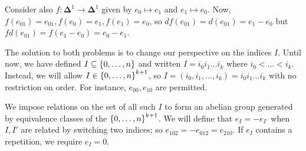 Consider also \( f \colon \bm\Delta^1 \to \bm\Delta^1 \) given by \( e_0 \mapsto e_1 \) and \( e_1 \mapsto e_0 \).
Now, \( f(e_{01}) = e_{01}, f(e_0) = e_1, f(e_1) = e_0 \), so \( df(e_{01}) = d(e_{01}) = e_1 - e_0 \) but \( fd(e_{01}) = f(e_1 - e_0) = e_0 - e_1 \).

The solution to both problems is to change our perspective on the indices \( I \).
Until now, we have defined \( I \subseteq \qty{0, \dots, n} \) and written \( I = i_0 i_1 \dots i_k \) where \( i_0 < \dots < i_k \).
Instead, we will allow \( I \in \qty{0, \dots, n}^{k+1} \), so \( I = (i_0, i_1, \dots, i_k) = i_0 i_1 \dots i_k \) with no restriction on order.
For instance, \( e_{00}, e_{10} \) are permitted.

We impose relations on the set of all such \( I \) to form an abelian group generated by equivalence classes of the \( \qty{0, \dots, n}^{k+1} \).
We will define that \( e_I = -e_{I'} \) when \( I, I' \) are related by switching two indices; so \( e_{102} = -e_{012} = e_{210} \).
If \( e_I \) contains a repetition, we require \( e_I = 0 \).

